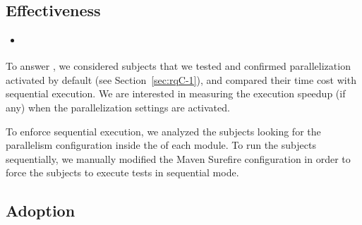
\subsection{Effectiveness}
\label{sec:rqD}

\begin{itemize}
    \item \textbf{\RQD}
\end{itemize}

To answer \numRQD{}, we considered \numProjectsPar{} subjects that we
tested and confirmed parallelization activated by default (see
Section~\ref{sec:rqC-1}), and compared their time cost with sequential
execution. We are interested in measuring the execution speedup (if
any) when the parallelization settings are activated.


To enforce sequential execution, we analyzed the \numProjectsPar{}
subjects looking for the parallelism configuration inside the \pomf{} 
of each module. To run the subjects sequentially, we manually modified 
the Maven Surefire configuration in order to force the subjects to
execute tests in sequential mode.

\begin{center}
\end{center}

\subsection{Adoption}
\label{sec:rqC}
\label{sec:rqE}

